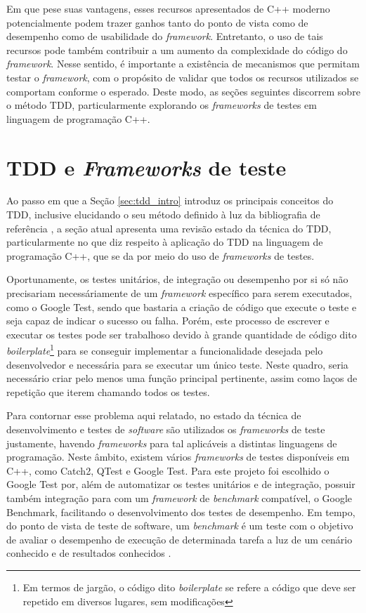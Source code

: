 Em que pese suas vantagens, esses recursos apresentados de C++ moderno
potencialmente podem trazer ganhos tanto do ponto de vista como de desempenho
como de usabilidade do \textit{framework}. Entretanto, o uso de tais recursos
pode também contribuir a um aumento da complexidade do código do
\textit{framework}. Nesse sentido, é importante a existência de mecanismos que
permitam testar o \textit{framework}, com o propósito de validar que todos os
recursos utilizados se comportam conforme o esperado. Deste modo, as seções
seguintes discorrem sobre o método TDD, particularmente explorando os
\textit{frameworks} de testes em linguagem de programação C++.

\section{TDD e \textit{Frameworks} de teste}\label{sec:test_frameworks}

Ao passo em que a Seção \ref{sec:tdd_intro} introduz os principais conceitos do
TDD, inclusive elucidando o seu método definido à luz da bibliografia de
referência \cite{ambler_2006}, a seção atual apresenta uma revisão estado da
técnica do TDD, particularmente no que diz respeito à aplicação do TDD na
linguagem de programação C++, que se da por meio do uso de \textit{frameworks}
de testes.

Oportunamente, os testes unitários, de integração ou desempenho por si só não
precisariam necessáriamente de um \textit{framework} específico para serem
executados, como o Google Test, sendo que bastaria a criação de código que
execute o teste e seja capaz de indicar o sucesso ou falha. Porém, este processo
de escrever e executar os testes pode ser trabalhoso devido à grande quantidade
de código dito \textit{boilerplate}\footnote{Em termos de jargão, o código dito
\textit{boilerplate} se refere a código que deve ser repetido em diversos
lugares, sem modificações} para se conseguir implementar a funcionalidade
desejada pelo desenvolvedor e necessária para se executar um único teste. Neste
quadro, seria necessário criar pelo menos uma função principal pertinente, assim
como laços de repetição que iterem chamando todos os testes.

Para contornar esse problema aqui relatado, no estado da técnica de
desenvolvimento e testes de \textit{software} são utilizados os
\textit{frameworks} de teste justamente, havendo \textit{frameworks} para tal
aplicáveis a distintas linguagens de programação. Neste âmbito, existem vários
\textit{frameworks} de testes disponíveis em C++, como Catch2, QTest e Google
Test. Para este projeto foi escolhido o Google Test por, além de automatizar os
testes unitários e de integração, possuir também integração para com um
\textit{framework} de \textit{benchmark} compatível, o Google Benchmark,
facilitando o desenvolvimento dos testes de desempenho. Em tempo, do ponto de
vista de teste de software, um \textit{benchmark} é um teste com o objetivo de
avaliar o desempenho de execução de determinada tarefa a luz de um cenário
conhecido e de resultados conhecidos \cite{nambiar_2009}.

